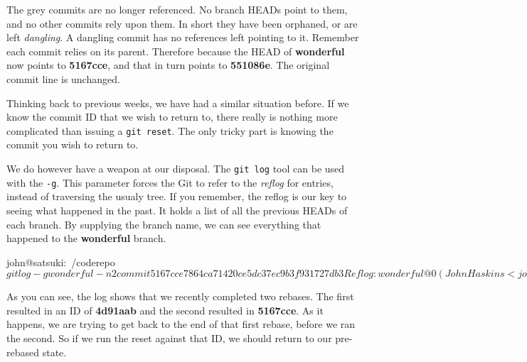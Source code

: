 
The grey commits are no longer referenced.
No branch HEADs point to them, and no other commits rely upon them.
In short they have been orphaned, or are left \emph{dangling}.
A dangling commit has no references left pointing to it.
Remember each commit relies on its parent.
Therefore because the HEAD of \textbf{wonderful} now points to \textbf{5167cce}, and that in turn points to \textbf{551086e}.
The original commit line is unchanged.

Thinking back to previous weeks, we have had a similar situation before.
If we know the commit ID that we wish to return to, there really is nothing more complicated than issuing a \texttt{git reset}.
The only tricky part is knowing the commit you wish to return to.

We do however have a weapon at our disposal.
The \texttt{git log} tool can be used with the \texttt{-g}.
This parameter forces the Git to refer to the \emph{reflog} for entries, instead of traversing the usualy tree.
If you remember, the reflog is our key to seeing what happened in the past.
It holds a list of all the previous HEADs of each branch.
By supplying the branch name, we can see everything that happened to the \textbf{wonderful} branch.

\begin{code}
john@satsuki:~/coderepo$ git log -g wonderful -n2
commit 5167cce7864ca71420ce5dc37ec9b3f931727db3
Reflog: wonderful@{0} (John Haskins <john.haskins@tamagoyakiinc.koala>)
Reflog message: rebase finished: refs/heads/wonderful onto f8d5100142b43ffaba9bb
Author: John Haskins <john.haskins@tamagoyakiinc.koala>
Date:   Wed Jul 6 09:30:40 2011 +0100

    Updated another file again

commit 4d91aab57aaad020e62486805e25d0d6f06fdc3e
Reflog: wonderful@{1} (John Haskins <john.haskins@tamagoyakiinc.koala>)
Reflog message: rebase -i (finish): refs/heads/wonderful onto 1c3206a
Author: John Haskins <john.haskins@tamagoyakiinc.koala>
Date:   Wed Jul 6 09:30:40 2011 +0100

    Updated another file again
john@satsuki:~/coderepo$
\end{code}

As you can see, the log shows that we recently completed two rebases.
The first resulted in an ID of \textbf{4d91aab} and the second resulted in \textbf{5167cce}.
As it happens, we are trying to get back to the end of that first rebase, before we ran the second.
So if we run the reset against that ID, we should return to our pre-rebased state.

